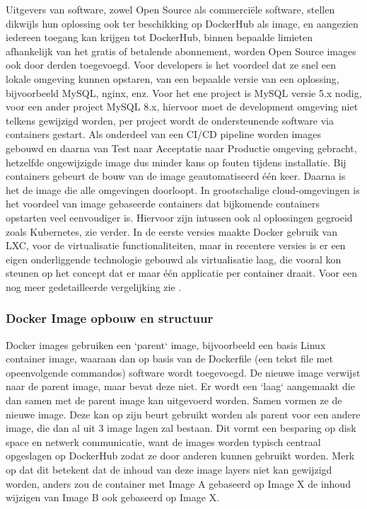 Uitgevers van software, zowel Open Source als commerciële software, stellen dikwijls hun oplossing ook ter beschikking op DockerHub als image, en aangezien iedereen toegang kan krijgen tot DockerHub, binnen bepaalde limieten afhankelijk van het gratis of betalende abonnement, worden Open Source images ook door derden toegevoegd.
\newline
Voor developers is het voordeel dat ze snel een lokale omgeving kunnen opstaren, van een bepaalde versie van een oplossing, bijvoorbeeld MySQL, nginx, enz. Voor het ene project is MySQL versie 5.x nodig, voor een ander project MySQL 8.x, hiervoor moet de development omgeving niet telkens gewijzigd worden, per project wordt de ondersteunende software via containers gestart.
\newline
Als onderdeel van een CI/CD pipeline worden images gebouwd en daarna van Test naar Acceptatie naar Productie omgeving gebracht, hetzelfde ongewijzigde image dus minder kans op fouten tijdens installatie. Bij containers gebeurt de bouw van de image geautomatiseerd \'e\'en keer. Daarna is het de image die alle omgevingen doorloopt.
\newline
In grootschalige cloud-omgevingen is het voordeel van image gebaseerde containers dat bijkomende containers opstarten veel eenvoudiger is. Hiervoor zijn intussen ook al oplossingen gegroeid zoals Kubernetes, zie verder.
\newline
In de eerste versies maakte Docker gebruik van LXC, voor de virtualisatie functionaliteiten, maar in recentere versies is er een eigen onderliggende technologie gebouwd als virtualisatie laag, die vooral kon steunen op het concept dat er maar \'e\'en applicatie per container draait. 
\newline
Voor een nog meer gedetailleerde vergelijking zie \textcite{Tunggal2023}.

\subsubsection{Docker Image opbouw en structuur}
Docker images gebruiken een `parent` image, bijvoorbeeld een basis Linux container image, waaraan dan op basis van de Dockerfile (een tekst file met opeenvolgende commandos) software wordt toegevoegd. De nieuwe image verwijst naar de parent image, maar bevat deze niet. Er wordt een `laag` aangemaakt die dan samen met de parent image kan uitgevoerd worden. Samen vormen ze de nieuwe image.
Deze kan op zijn beurt gebruikt worden als parent voor een andere image, die dan al uit 3 image lagen zal bestaan. Dit vormt een besparing op disk space en netwerk communicatie, want de images worden typisch centraal opgeslagen op DockerHub zodat ze door anderen kunnen gebruikt worden.
Merk op dat dit betekent dat de inhoud van deze image layers niet kan gewijzigd worden, anders zou de container met Image A gebaseerd op Image X de inhoud wijzigen van Image B ook gebaseerd op Image X. 

